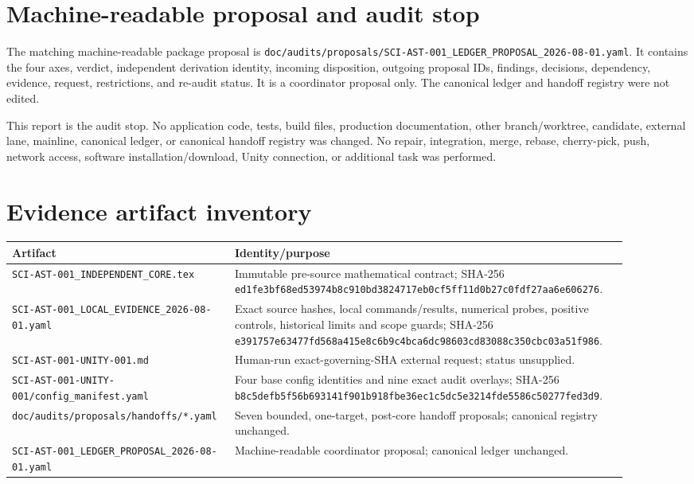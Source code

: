 \documentclass[11pt]{article}
\newcommand{\code}[1]{\nolinkurl{#1}}
\begin{document}
\section{Machine-readable proposal and audit stop}

The matching machine-readable package proposal is
\code{doc/audits/proposals/SCI-AST-001_LEDGER_PROPOSAL_2026-08-01.yaml}. It
contains the four axes, verdict, independent derivation identity, incoming
disposition, outgoing proposal IDs, findings, decisions, dependency,
evidence, request, restrictions, and re-audit status. It is a coordinator
proposal only. The canonical ledger and handoff registry were not edited.

This report is the audit stop. No application code, tests, build files,
production documentation, other branch/worktree, candidate, external lane,
mainline, canonical ledger, or canonical handoff registry was changed. No
repair, integration, merge, rebase, cherry-pick, push, network access, software
installation/download, Unity connection, or additional task was performed.

\appendix
\section{Evidence artifact inventory}

\begin{longtable}{L{0.29\linewidth}L{0.61\linewidth}}
\toprule
Artifact & Identity/purpose \\
\midrule
\endhead
\code{SCI-AST-001_INDEPENDENT_CORE.tex} & Immutable pre-source mathematical contract; SHA-256 \code{ed1fe3bf68ed53974b8c910bd3824717eb0cf5ff11d0b27c0fdf27aa6e606276}. \\
\code{SCI-AST-001_LOCAL_EVIDENCE_2026-08-01.yaml} & Exact source hashes, local commands/results, numerical probes, positive controls, historical limits and scope guards; SHA-256 \code{e391757e63477fd568a415e8c6b9c4bca6dc98603cd83088c350cbc03a51f986}. \\
\code{SCI-AST-001-UNITY-001.md} & Human-run exact-governing-SHA external request; status unsupplied. \\
\code{SCI-AST-001-UNITY-001/config_manifest.yaml} & Four base config identities and nine exact audit overlays; SHA-256 \code{b8c5defb5f56b693141f901b918fbe36ec1c5dc5e3214fde5586c50277fed3d9}. \\
\code{doc/audits/proposals/handoffs/*.yaml} & Seven bounded, one-target, post-core handoff proposals; canonical registry unchanged. \\
\code{SCI-AST-001_LEDGER_PROPOSAL_2026-08-01.yaml} & Machine-readable coordinator proposal; canonical ledger unchanged. \\
\bottomrule
\end{longtable}
\end{document}
